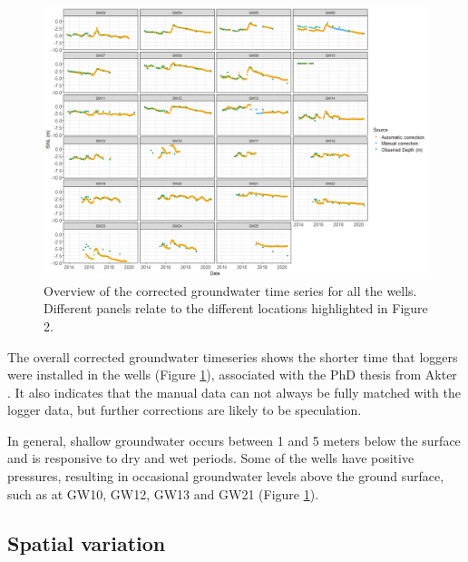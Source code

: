 \documentclass[, manuscript]{copernicus}
\begin{document}
\begin{figure}
\includegraphics[width=1\linewidth]{Figures/Final_Corrected_piezodepths} \caption{Overview of the corrected groundwater time series for all the wells. Different panels relate to the different locations highlighted in Figure 2.}\label{fig:gw-series}
\end{figure}

The overall corrected groundwater timeseries shows the shorter time that
loggers were installed in the wells (Figure \ref{fig:gw-series}),
associated with the PhD thesis from Akter \citeyearpar{Akter2018}. It
also indicates that the manual data can not always be fully matched with
the logger data, but further corrections are likely to be speculation.

In general, shallow groundwater occurs between 1 and 5 meters below the
surface and is responsive to dry and wet periods. Some of the wells have
positive pressures, resulting in occasional groundwater levels above the
ground surface, such as at GW10, GW12, GW13 and GW21 (Figure
\ref{fig:gw-series}).

\subsection{Spatial variation}

\clearpage
\end{document}
